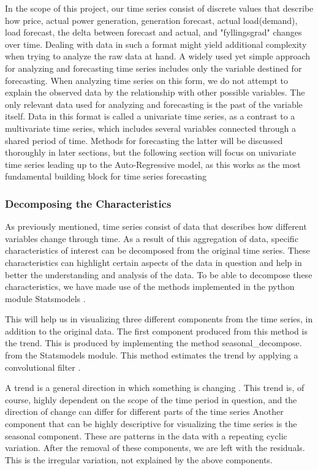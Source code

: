 \documentclass
[twocolumn,
secnumarabic,
nobibnotes,
aps,
prl,
reprint,
groupedaddress,
amsmath,
amssymb,
]{revtex4-2}
\begin{document}
In the scope of this project, our time series consist of discrete values that describe how price, actual power generation, generation forecast, actual load(demand), load forecast, the delta between forecast and actual, and "fyllingsgrad" changes over time. 
Dealing with data in such a format might yield additional complexity when trying to analyze the raw data at hand. A widely used yet simple approach for analyzing and forecasting time series includes only the variable destined for forecasting. When analyzing time series on this form, we do not attempt to explain the observed data by the relationship with other possible variables. The only relevant data used for analyzing and forecasting is the past of the variable itself. Data in this format is called a univariate time series, as a contrast to a multivariate time series, which includes several variables connected through a shared period of time. Methods for forecasting the latter will be discussed thoroughly in later sections, but the following section will focus on univariate time series leading up to the Auto-Regressive model, as this works as the most fundamental building block for time series forecasting \cite{Korstanje2021} 

\subsubsection{Decomposing the Characteristics}
As previously mentioned, time series consist of data that describes how different variables change through time. As a result of this aggregation of data, specific characteristics of interest can be decomposed from the original time series. These characteristics can highlight certain aspects of the data in question and help in better the understanding and analysis of the data. To be able to decompose these characteristics, we have made use of the methods implemented in the python module Statsmodels \cite{seabold2010statsmodels}. 


This will help us in visualizing three different components from the time series, in addition to the original data. The first component produced from this method is the trend. This is produced by implementing the method seasonal\_decompose. from the Statsmodels module. This method estimates the trend by applying a convolutional filter \cite{seabold2010statsmodels}. 

A trend is a general direction in which something is changing \cite{Auffarth2021}. This trend is, of course, highly dependent on the scope of the time period in question, and the direction of change can differ for different parts of the time series \cite{Vishwas2020}  
Another component that can be highly descriptive for visualizing the time series is the seasonal component. These are patterns in the data with a repeating cyclic variation. After the removal of these components, we are left with the residuals. This is the irregular variation, not explained by the above components\cite{Vishwas2020}.
\end{document}
